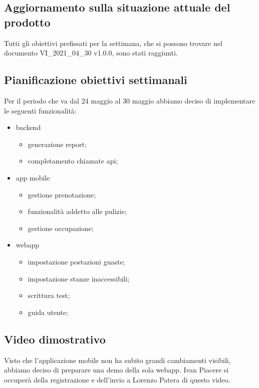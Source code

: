 \subsection{Aggiornamento sulla situazione attuale del prodotto}
Tutti gli obiettivi prefissati per la settimana, che si possono trovare nel documento VI\_2021\_04\_30 v1.0.0, sono stati raggiunti.
\subsection{Pianificazione obiettivi settimanali}
Per il periodo che va dal 24 maggio al 30 maggio abbiamo deciso di implementare le seguenti funzionalità:
\begin{itemize}
	\item backend
	\begin{itemize}
		\item generazione report;
		\item completamento chiamate api;
	\end{itemize}
	\item app mobile
	\begin{itemize}
		\item gestione prenotazione;
		\item funzionalità addetto alle pulizie;
		\item gestione occupazione;
	\end{itemize}
	\item webapp
	\begin{itemize}
		\item impostazione postazioni guaste;
		\item impostazione stanze inaccessibili;
		\item scrittura test;
		\item guida utente;
	\end{itemize}
\end{itemize}
\subsection{Video dimostrativo}
Visto che l'applicazione mobile non ha subito grandi cambiamenti visibili, abbiamo deciso di preparare una demo della sola webapp. Ivan Piacere si occuperà della registrazione e dell'invio a Lorenzo Patera di questo video.
